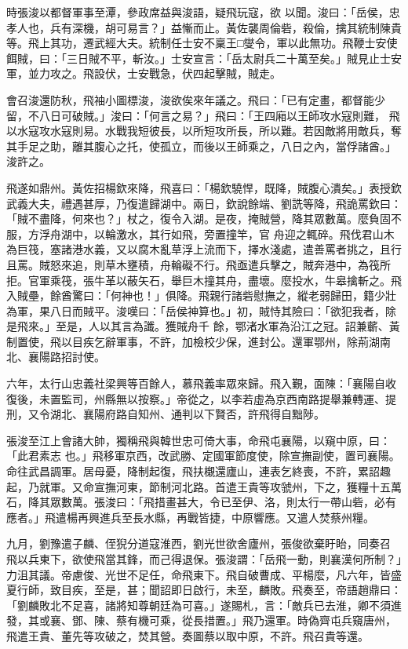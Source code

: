\begin{pinyinscope}
 時張浚以都督軍事至潭，參政席益與浚語，疑飛玩寇，欲
 以聞。浚曰：「岳侯，忠孝人也，兵有深機，胡可易言？」益慚而止。黃佐襲周倫砦，殺倫，擒其統制陳貴等。飛上其功，遷武經大夫。統制任士安不稟王□燮令，軍以此無功。飛鞭士安使餌賊，曰：「三日賊不平，斬汝。」士安宣言：「岳太尉兵二十萬至矣。」賊見止士安軍，並力攻之。飛設伏，士安戰急，伏四起擊賊，賊走。



 會召浚還防秋，飛袖小圖標浚，浚欲俟來年議之。飛曰：「已有定畫，都督能少留，不八日可破賊。」浚曰：「何言之易？」飛曰：「王四廂以王師攻水寇則難，
 飛以水寇攻水寇則易。水戰我短彼長，以所短攻所長，所以難。若因敵將用敵兵，奪其手足之助，離其腹心之托，使孤立，而後以王師乘之，八日之內，當俘諸酋。」浚許之。



 飛遂如鼎州。黃佐招楊欽來降，飛喜曰：「楊欽驍悍，既降，賊腹心潰矣。」表授欽武義大夫，禮遇甚厚，乃復遣歸湖中。兩日，欽說餘端、劉詵等降，飛詭罵欽曰：「賊不盡降，何來也？」杖之，復令入湖。是夜，掩賊營，降其眾數萬。麼負固不服，方浮舟湖中，以輪激水，其行如飛，旁置撞竿，官
 舟迎之輒碎。飛伐君山木為巨筏，塞諸港水義，又以腐木亂草浮上流而下，擇水淺處，遣善罵者挑之，且行且罵。賊怒來追，則草木壅積，舟輪礙不行。飛亟遣兵擊之，賊奔港中，為筏所拒。官軍乘筏，張牛革以蔽矢石，舉巨木撞其舟，盡壞。麼投水，牛皋擒斬之。飛入賊壘，餘酋驚曰：「何神也！」俱降。飛親行諸砦慰撫之，縱老弱歸田，籍少壯為軍，果八日而賊平。浚嘆曰：「岳侯神算也。」初，賊恃其險曰：「欲犯我者，除是飛來。」至是，人以其言為讖。獲賊舟千
 餘，鄂渚水軍為沿江之冠。詔兼蘄、黃制置使，飛以目疾乞辭軍事，不許，加檢校少保，進封公。還軍鄂州，除荊湖南北、襄陽路招討使。



 六年，太行山忠義社梁興等百餘人，慕飛義率眾來歸。飛入覲，面陳：「襄陽自收復後，未置監司，州縣無以按察。」帝從之，以李若虛為京西南路提舉兼轉運、提刑，又令湖北、襄陽府路自知州、通判以下賢否，許飛得自黜陟。



 張浚至江上會諸大帥，獨稱飛與韓世忠可倚大事，命飛屯襄陽，以窺中原，曰：「此君素志
 也。」飛移軍京西，改武勝、定國軍節度使，除宣撫副使，置司襄陽。命往武昌調軍。居母憂，降制起復，飛扶櫬還廬山，連表乞終喪，不許，累詔趣起，乃就軍。又命宣撫河東，節制河北路。首遣王貴等攻虢州，下之，獲糧十五萬石，降其眾數萬。張浚曰：「飛措畫甚大，令已至伊、洛，則太行一帶山砦，必有應者。」飛遣楊再興進兵至長水縣，再戰皆捷，中原響應。又遣人焚蔡州糧。



 九月，劉豫遣子麟、侄猊分道寇淮西，劉光世欲舍廬州，張俊欲棄盱眙，同奏召
 飛以兵東下，欲使飛當其鋒，而己得退保。張浚謂：「岳飛一動，則襄漢何所制？」力沮其議。帝慮俊、光世不足任，命飛東下。飛自破曹成、平楊麼，凡六年，皆盛夏行師，致目疾，至是，甚；聞詔即日啟行，未至，麟敗。飛奏至，帝語趙鼎曰：「劉麟敗北不足喜，諸將知尊朝廷為可喜。」遂賜札，言：「敵兵已去淮，卿不須進發，其或襄、鄧、陳、蔡有機可乘，從長措置。」飛乃還軍。時偽齊屯兵窺唐州，飛遣王貴、董先等攻破之，焚其營。奏圖蔡以取中原，不許。飛召貴等還。




\end{pinyinscope}
